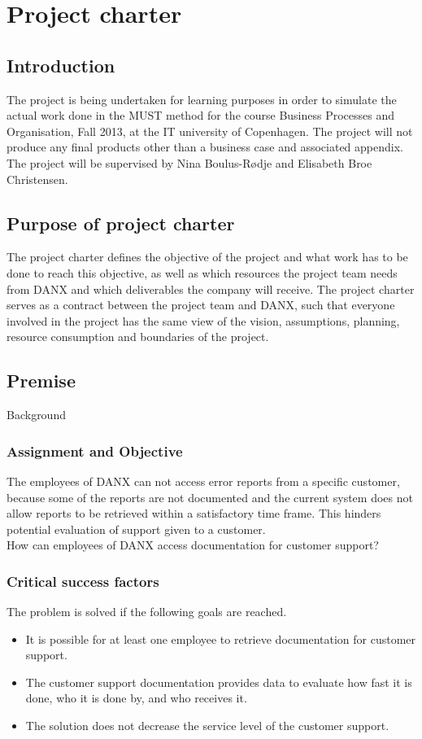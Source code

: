 \chapter{Project charter}

\section{Introduction}
The project is being undertaken for learning purposes in order to simulate the actual work done in the MUST method for the course Business Processes and Organisation, Fall 2013, at the IT university of Copenhagen. The project will not produce any final products other than a business case and associated appendix. The project will be supervised by Nina Boulus-Rødje and Elisabeth Broe Christensen.

\section{Purpose of project charter}
The project charter defines the objective of the project and what work has to be done to reach this objective, as well as which resources the project team needs from DANX and which deliverables the company will receive. The project charter serves as a contract between the project team and DANX, such that everyone involved in the project has the same view of the vision, assumptions, planning, resource consumption and boundaries of the project.

\section{Premise}
Background

\subsection{Assignment and Objective}
The employees of DANX can not access error reports from a specific customer, because some of the reports are not documented and the current system does not allow reports to be retrieved within a satisfactory time frame. This hinders potential evaluation of support given to a customer.\\
How can employees of DANX access documentation for customer support?

\subsection{Critical success factors}
The problem is solved if the following goals are reached.
\begin{itemize}
	\item It is possible for at least one employee to retrieve documentation for customer support.
	\item The customer support documentation provides data to evaluate how fast it is done, who it is done by, and who receives it.
	\item The solution does not decrease the service level of the customer support.
\end{itemize}

